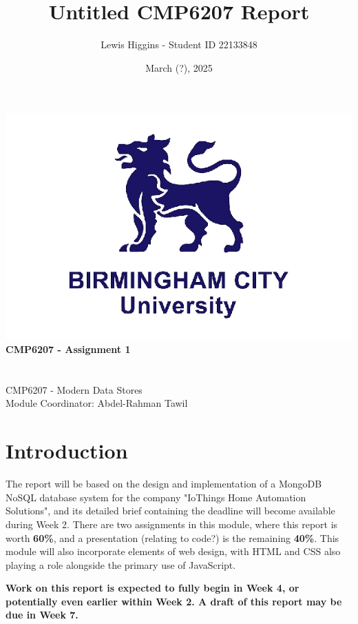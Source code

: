 \documentclass[12pt]{report}
\title{Untitled CMP6207 Report}
\author{Lewis Higgins - Student ID 22133848}
\date{March (?), 2025}
\newcommand{\para}{\vspace{7pt}\noindent}
\begin{document}
\makeatletter
\begin{titlepage}
    \begin{center}
        \includegraphics[width=0.7\linewidth]{BCU}\\[4ex]
        {\huge \bfseries CMP6207 - Assignment 1}\\[2ex]
        {\large \bfseries  \@title}\\[50ex]
        {\@author}\\[2ex]
        {CMP6207 - Modern Data Stores}\\[2ex]
        {Module Coordinator: Abdel-Rahman Tawil}\\[5ex]
    \end{center}
\end{titlepage}
\makeatother
\thispagestyle{empty}
\newpage


\setcounter{page}{0}

\tableofcontents
\thispagestyle{empty}

\chapter*{Introduction}
The report will be based on the design and implementation of a MongoDB NoSQL database system 
for the company "IoThings Home Automation Solutions", and its detailed brief containing the deadline
will become available during Week 2. There are two assignments in this module, where this report is
worth \textbf{60\%}, and a presentation (relating to code?) is the remaining \textbf{40\%}. This module 
will also incorporate elements of web design, with HTML and CSS also playing a role alongside the primary 
use of JavaScript.

\para \textbf{Work on this report is expected to fully begin in Week 4, or potentially even earlier within Week 2. 
A draft of this report may be due in Week 7.}
\end{document}
